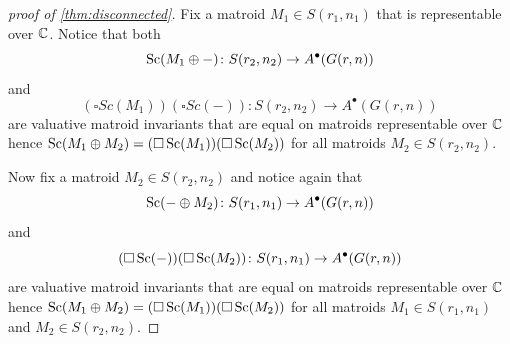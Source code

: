 \begin{proof}[proof of \cref{thm:disconnected}]
    Fix a matroid $M_1 \in S(r_1,n_1)$ that is representable over ${\mathbb C}$. Notice that both
    \begin{equation*}
        \operatorname{\mathrm{Sc}}(M_1 \oplus - ) \colon S(r_2,n_2) \to A^\bullet(G(r,n))
    \end{equation*}
    and 
    \begin{equation*}
        (\square Sc(M_1)) (\square Sc(-)) \colon S(r_2,n_2) \to A^\bullet(G(r,n))
    \end{equation*}
    are valuative matroid invariants that are equal on matroids representable over ${\mathbb C}$ hence $\operatorname{\mathrm{Sc}}(M_1 \oplus M_2) = (\square \operatorname{\mathrm{Sc}}(M_1)) (\square \operatorname{\mathrm{Sc}}(M_2))$ for all matroids $M_2 \in S(r_2,n_2)$.
    
    Now fix a matroid $M_2 \in S(r_2,n_2)$ and notice again that 
    \begin{equation*}
        \operatorname{\mathrm{Sc}}(- \oplus M_2) \colon S(r_1,n_1) \to A^\bullet(G(r,n))
    \end{equation*}
    and 
    \begin{equation*}
        (\square \operatorname{\mathrm{Sc}}(-)) (\square \operatorname{\mathrm{Sc}}(M_2)) \colon S(r_1,n_1) \to A^\bullet(G(r,n))
    \end{equation*}
    are valuative matroid invariants that are equal on matroids representable over ${\mathbb C}$ hence $\operatorname{\mathrm{Sc}}(M_1 \oplus M_2) = (\square \operatorname{\mathrm{Sc}}(M_1)) (\square \operatorname{\mathrm{Sc}}(M_2))$ for all matroids $M_1 \in S(r_1,n_1)$ and $M_2 \in S(r_2,n_2)$.
\end{proof}

